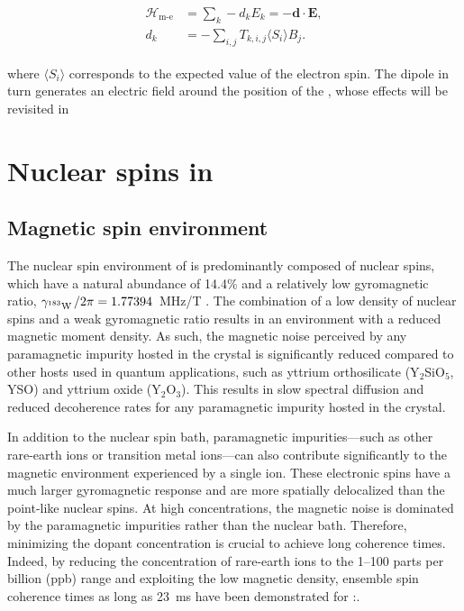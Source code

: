 \begin{align}
\begin{split}
    \mathcal{H}_{\text{m-e}} &= \sum_k-d_k E_k = -\mathbf{d} \cdot \mathbf{E}, \\
    d_k &= - \sum_{i,j} T_{k, i, j} \langle S_{i}\rangle B_j.
\end{split}
\label{seq:electric_dipole}
\end{align}

where $\langle S_i \rangle$ corresponds to the expected value of the electron spin. The dipole in turn generates an electric field around the position of the \Er, whose effects will be revisited in 


\section{Nuclear spins in \Ca}

\subsection{Magnetic spin environment}

The nuclear spin environment of \Ca is predominantly composed of \W nuclear spins, which have a natural abundance of 14.4\% and a relatively low gyromagnetic ratio, $\gamma_{\text{$^{183}$W\,}}/2\pi = 1.77394$~MHz/T . The combination of a low density of nuclear spins and a weak gyromagnetic ratio results in an environment with a reduced magnetic moment density.
As such, the magnetic noise perceived by any paramagnetic impurity hosted in the crystal is significantly reduced compared to other hosts used in quantum applications, such as yttrium orthosilicate (Y$_2$SiO$_5$, YSO) and yttrium oxide (Y$_2$O$_3$). This results in slow spectral diffusion and reduced decoherence rates for any paramagnetic impurity hosted in the crystal.

In addition to the nuclear spin bath, paramagnetic impurities—such as other rare-earth ions or transition metal ions—can also contribute significantly to the magnetic environment experienced by a single \Er ion. These electronic spins have a much larger gyromagnetic response and are more spatially delocalized than the point-like nuclear spins. At high concentrations, the magnetic noise is dominated by the paramagnetic impurities rather than the nuclear bath. Therefore, minimizing the dopant concentration is crucial to achieve long coherence times. Indeed, by reducing the concentration of rare-earth ions to the 1--100 parts per billion (ppb) range and exploiting the low magnetic density, ensemble spin coherence times as long as 23~ms have been demonstrated for \Er:\Ca {}.

